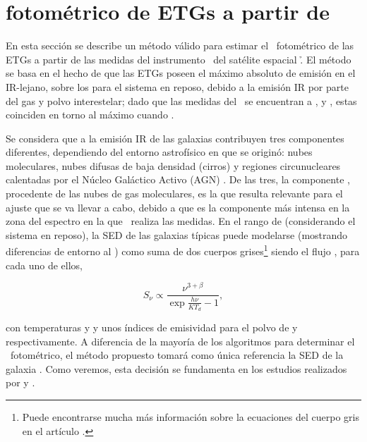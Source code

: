 \section{ fotométrico de ETGs a partir de \spire}\label{sec:3_redshift_hatlas}

En esta sección se describe un método válido para estimar el \rt\ fotométrico de las ETGs a partir de las medidas del instrumento \spire\ del satélite espacial \h.  El método se basa en el hecho de que las ETGs poseen el máximo absoluto de emisión en el IR-lejano, sobre los  para el sistema en reposo, debido a la emisión IR por parte del gas y polvo interestelar; dado que las medidas del \spire\ se encuentran a ,  y , estas coinciden en torno al máximo cuando . 

Se considera que a la emisión IR de las galaxias  contribuyen tres componentes diferentes, dependiendo del entorno astrofísico en que se originó: nubes moleculares, nubes difusas de baja densidad (cirros) y regiones circunucleares calentadas por el Núcleo Galáctico Activo (AGN) \citep{article:Lapi_2011}. De las tres, la componente , procedente de las nubes de gas moleculares, es la que resulta relevante para el ajuste que se va llevar a cabo, debido a que es la componente más intensa en la zona del espectro en la que \spire\ realiza las medidas. En el rango de  (considerando el sistema en reposo), la SED de las galaxias  típicas puede modelarse (mostrando diferencias de entorno al ) como suma de dos cuerpos grises\footnote{Puede encontrarse mucha más información sobre la ecuaciones del cuerpo gris en el artículo \cite{article:cuerpo_gris}.}  siendo el flujo , para cada uno de ellos, 

\begin{equation}
{S}_{\nu} \propto \frac{{\nu}^{3+\beta}}{\exp{\frac{h\nu}{K{T}_{d}}}-1},
\end{equation}

con temperaturas  y  y unos índices de emisividad para el polvo de  y  respectivamente. 
A diferencia de la mayoría de los algoritmos para determinar el \rt\ fotométrico, el método propuesto tomará como única referencia la SED de la galaxia \smm. Como veremos, esta decisión se fundamenta en los estudios realizados por \cite{article:Nuevo_2012} y \cite{article:Lapi_2011}. 

